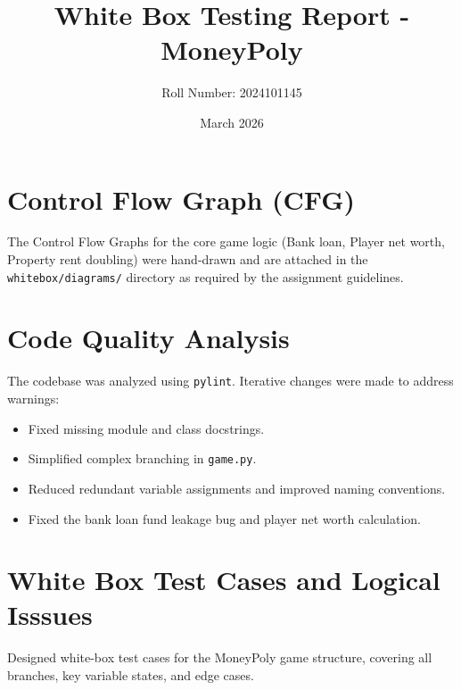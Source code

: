 \documentclass{article}
\title{White Box Testing Report - MoneyPoly}
\author{Roll Number: 2024101145}
\date{March 2026}
\begin{document}
\maketitle

\section{Control Flow Graph (CFG)}
The Control Flow Graphs for the core game logic (Bank loan, Player net worth, Property rent doubling) were hand-drawn and are attached in the \texttt{whitebox/diagrams/} directory as required by the assignment guidelines.

\section{Code Quality Analysis}
The codebase was analyzed using \texttt{pylint}. Iterative changes were made to address warnings:
\begin{itemize}
    \item Fixed missing module and class docstrings.
    \item Simplified complex branching in \texttt{game.py}.
    \item Reduced redundant variable assignments and improved naming conventions.
    \item Fixed the bank loan fund leakage bug and player net worth calculation.
\end{itemize}

\section{White Box Test Cases and Logical Isssues}
Designed white-box test cases for the MoneyPoly game structure, covering all branches, key variable states, and edge cases.
\end{document}
